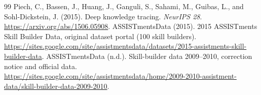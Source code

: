 \documentclass[11pt,a4paper]{article}
\begin{document}
\begin{thebibliography}{99}
 Piech, C., Bassen, J., Huang, J., Ganguli, S., Sahami, M., Guibas, L., and Sohl-Dickstein, J. (2015). Deep knowledge tracing. \emph{NeurIPS 28}. \url{https://arxiv.org/abs/1506.05908}.
 ASSISTmentsData (2015). 2015 ASSISTments Skill Builder Data, original dataset portal (100 skill builders). \url{https://sites.google.com/site/assistmentsdata/datasets/2015-assistments-skill-builder-data}.
 ASSISTmentsData (n.d.). Skill-builder data 2009--2010, correction notice and official data. \url{https://sites.google.com/site/assistmentsdata/home/2009-2010-assistment-data/skill-builder-data-2009-2010}.
\end{thebibliography}
\endgroup
\end{document}
